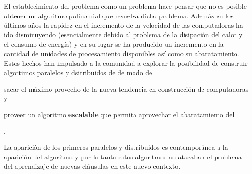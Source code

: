 El establecimiento del problema \sat como un problema \npc hace pensar que no es
posible obtener un algoritmo polinomial que resuelva dicho problema. Además en
los últimos años la rapidez en el incremento de la velocidad de las computadoras
ha ido disminuyendo (esencialmente debido al problema de la disipación del calor
y el consumo de energía) y en su lugar se ha producido un incremento en la
cantidad de unidades de procesamiento disponibles así como su abaratamiento.
Estos hechos han impulsado a la comunidad \sat a explorar la posibilidad de
construir algortimos paralelos y dsitribuidos de \ssolving de modo de
\begin{inparaenum}[a)] \item sacar el máximo provecho de la nueva tendencia en
construcción de computadoras y \item proveer un algoritmo \textbf{escalable} que
permita aprovechar el abaratamiento del \hard \end{inparaenum}.

La aparición de los primeros \ssolvers paralelos y distribuidos
\cite{bohm:1996:afast, zhang:jsc-1996} es contemporánea a la aparición del
algoritmo \CDCL y por lo tanto estos algoritmos no atacaban el problema del
aprendizaje de nuevas cláusulas en este nuevo contexto.
